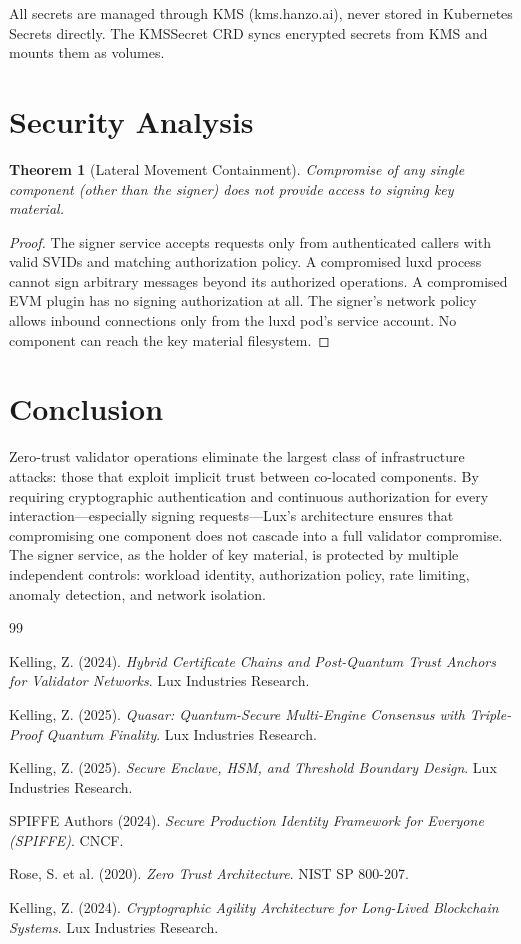 \documentclass[11pt]{article}
\newtheorem{theorem}{Theorem}
\begin{document}
All secrets are managed through KMS (kms.hanzo.ai), never stored in Kubernetes Secrets directly. The KMSSecret CRD syncs encrypted secrets from KMS and mounts them as volumes.

\section{Security Analysis}

\begin{theorem}[Lateral Movement Containment]
Compromise of any single component (other than the signer) does not provide access to signing key material.
\end{theorem}

\begin{proof}
The signer service accepts requests only from authenticated callers with valid SVIDs and matching authorization policy. A compromised luxd process cannot sign arbitrary messages beyond its authorized operations. A compromised EVM plugin has no signing authorization at all. The signer's network policy allows inbound connections only from the luxd pod's service account. No component can reach the key material filesystem.
\end{proof}

\section{Conclusion}

Zero-trust validator operations eliminate the largest class of infrastructure attacks: those that exploit implicit trust between co-located components. By requiring cryptographic authentication and continuous authorization for every interaction---especially signing requests---Lux's architecture ensures that compromising one component does not cascade into a full validator compromise. The signer service, as the holder of key material, is protected by multiple independent controls: workload identity, authorization policy, rate limiting, anomaly detection, and network isolation.

\begin{thebibliography}{99}

Kelling, Z. (2024).
\textit{Hybrid Certificate Chains and Post-Quantum Trust Anchors for Validator Networks}.
Lux Industries Research.

Kelling, Z. (2025).
\textit{Quasar: Quantum-Secure Multi-Engine Consensus with Triple-Proof Quantum Finality}.
Lux Industries Research.

Kelling, Z. (2025).
\textit{Secure Enclave, HSM, and Threshold Boundary Design}.
Lux Industries Research.

SPIFFE Authors (2024).
\textit{Secure Production Identity Framework for Everyone (SPIFFE)}.
CNCF.

Rose, S. et al. (2020).
\textit{Zero Trust Architecture}.
NIST SP 800-207.

Kelling, Z. (2024).
\textit{Cryptographic Agility Architecture for Long-Lived Blockchain Systems}.
Lux Industries Research.

\end{thebibliography}
\end{document}

